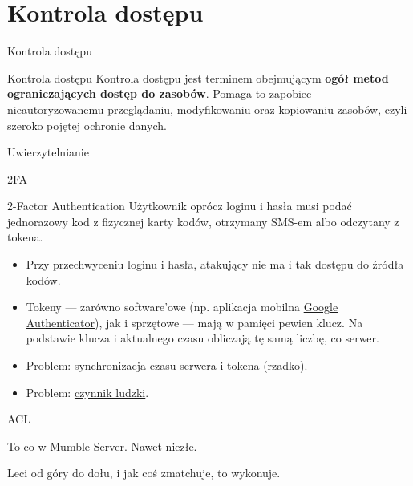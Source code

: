 \section{Kontrola dostępu}

\begin{frame}{Kontrola dostępu}
		\begin{alertblock}{Kontrola dostępu}
			Kontrola dostępu jest terminem obejmującym \textbf{ogół metod ograniczających dostęp do zasobów}.
			Pomaga to zapobiec nieautoryzowanemu przeglądaniu, modyfikowaniu oraz kopiowaniu zasobów, czyli szeroko pojętej ochronie danych. 
		\end{alertblock}		
\end{frame}


\begin{frame}{Uwierzytelnianie}

\end{frame}

\begin{frame}{2FA}
	
	\begin{alertblock}{2-Factor Authentication}
		Użytkownik oprócz loginu i hasła musi podać jednorazowy kod z fizycznej karty kodów, otrzymany SMS-em albo odczytany z tokena.
	\end{alertblock}
	
	\begin{itemize}
		\item Przy przechwyceniu loginu i hasła, atakujący nie ma i tak dostępu do źródła kodów.
		
		\item Tokeny — zarówno software'owe (np. aplikacja mobilna \href{https://play.google.com/store/apps/details?id=com.google.android.apps.authenticator2}{Google Authenticator}), jak i sprzętowe — mają w pamięci pewien klucz. Na podstawie klucza i aktualnego czasu obliczają tę samą liczbę, co serwer.
	
		\item Problem: synchronizacja czasu serwera i tokena (rzadko).
		
		\item Problem: \href{http://zaufanatrzeciastrona.pl/post/jak-absolutnie-nie-uzywac-tokenow/}{czynnik ludzki}.
	\end{itemize}
	
\end{frame}

\begin{frame}{ACL}
	
	To co w Mumble Server. Nawet niezłe.
	
	Leci od góry do dołu, i jak coś zmatchuje, to wykonuje.
	
\end{frame}


